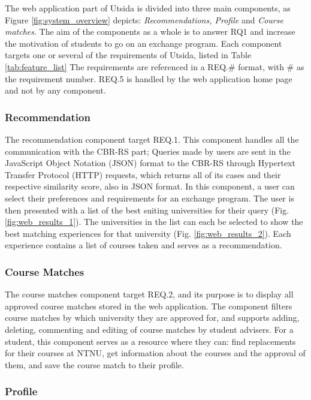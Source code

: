 The web application part of Utsida is divided into three main components, as Figure \ref{fig:system_overview} depicts: \emph{Recommendations, Profile} and \emph{Course matches}. The aim of the components as a whole is to answer RQ1 and increase the motivation of students to go on an exchange program. Each component targets one or several of the requirements of Utsida, listed in Table \ref{tab:feature_list} The requirements are referenced in a REQ.\# format, with \# as the requirement number. REQ.5 is handled by the web application home page and not by any component.

\subsubsection{Recommendation}

The recommendation component target REQ.1. This component handles all the communication with the CBR-RS part; Queries made by users are sent in the JavaScript Object Notation (JSON) format to the CBR-RS through Hypertext Transfer Protocol (HTTP) requests, which returns all of its cases and their respective similarity score, also in JSON format. In this component, a user can select their preferences and requirements for an exchange program. The user is then presented with a list of the best suiting universities for their query (Fig. \ref{fig:web_results_1}). The universities in the list can each be selected to show the best matching experiences for that university (Fig. \ref{fig:web_results_2}). Each experience contains a list of courses taken and serves as a recommendation.

\subsubsection{Course Matches}\label{sec_course_matches}

The course matches component target REQ.2, and its purpose is to display all approved course matches stored in the web application. The component filters course matches by which university they are approved for, and supports adding, deleting, commenting and editing of course matches by student advisers. For a student, this component serves as a resource where they can: find replacements for their courses at NTNU, get information about the courses and the approval of them, and save the course match to their profile.

\subsubsection{Profile}

